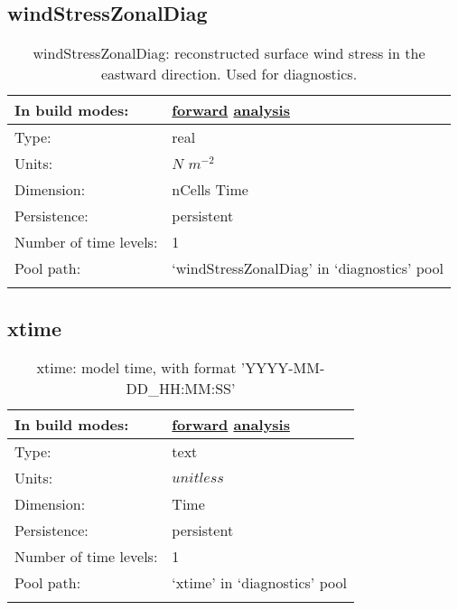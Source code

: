 \subsection[windStressZonalDiag]{windStressZonalDiag}
\label{subsec:var_sec_diagnostics_windStressZonalDiag}
\begin{center}
\begin{longtable}{| p{2.0in} | p{4.0in} |}
        \hline 
        In build modes: & \hyperref[subsec:forward_var_tab_diagnostics]{forward} \hyperref[subsec:analysis_var_tab_diagnostics]{analysis} \\
        \hline 
        Type: & real \\
        \hline 
        Units: & $N$ $m^{-2}$ \\
        \hline 
        Dimension: & nCells Time \\
        \hline 
        Persistence: & persistent \\
        \hline 
        Number of time levels: & 1 \\
        \hline 
            Pool path: & `windStressZonalDiag' in `diagnostics' pool \\
		 \hline 
    \caption{windStressZonalDiag: reconstructed surface wind stress in the eastward direction. Used for diagnostics.}
\end{longtable}
\end{center}
\subsection[xtime]{xtime}
\label{subsec:var_sec_diagnostics_xtime}
\begin{center}
\begin{longtable}{| p{2.0in} | p{4.0in} |}
        \hline 
        In build modes: & \hyperref[subsec:forward_var_tab_diagnostics]{forward} \hyperref[subsec:analysis_var_tab_diagnostics]{analysis} \\
        \hline 
        Type: & text \\
        \hline 
        Units: & $unitless$ \\
        \hline 
        Dimension: & Time \\
        \hline 
        Persistence: & persistent \\
        \hline 
        Number of time levels: & 1 \\
        \hline 
            Pool path: & `xtime' in `diagnostics' pool \\
		 \hline 
    \caption{xtime: model time, with format 'YYYY-MM-DD\_HH:MM:SS'}
\end{longtable}
\end{center}
